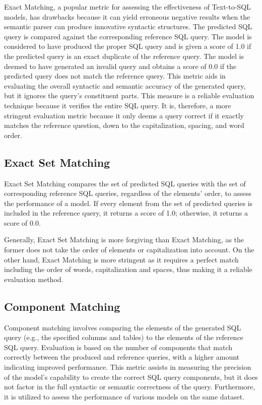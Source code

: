 Exact Matching\cite{xu_sqlnet_2017}, a popular metric for assessing the effectiveness of Text-to-SQL models, has drawbacks because it can yield erroneous negative results when the semantic parser can produce innovative syntactic structures. The predicted SQL query is compared against the corresponding reference SQL query. The model is considered to have produced the proper SQL query and is given a score of 1.0 if the predicted query is an exact duplicate of the reference query. The model is deemed to have generated an invalid query and obtains a score of 0.0 if the predicted query does not match the reference query. This metric aids in evaluating the overall syntactic and semantic accuracy of the generated query, but it ignores the query's constituent parts. This measure is a reliable evaluation technique because it verifies the entire SQL query. It is, therefore, a more stringent evaluation metric because it only deems a query correct if it exactly matches the reference question, down to the capitalization, spacing, and word order.


\subsection{Exact Set Matching}

Exact Set Matching compares the set of predicted SQL queries with the set of corresponding reference SQL queries, regardless of the elements' order, to assess the performance of a model. If every element from the set of predicted queries is included in the reference query, it returns a score of 1.0; otherwise, it returns a score of 0.0.

Generally, Exact Set Matching is more forgiving than Exact Matching, as the former does not take the order of elements or capitalization into account. On the other hand, Exact Matching is more stringent as it requires a perfect match including the order of words, capitalization and spaces, thus making it a reliable evaluation method.


\subsection{Component Matching}

Component matching\cite{yu_spider_2019} involves comparing the elements of the generated SQL query (e.g., the specified columns and tables) to the elements of the reference SQL query. Evaluation is based on the number of components that match correctly between the produced and reference queries, with a higher amount indicating improved performance. This metric assists in measuring the precision of the model's capability to create the correct SQL query components, but it does not factor in the full syntactic or semantic correctness of the query. Furthermore, it is utilized to assess the performance of various models on the same dataset.

